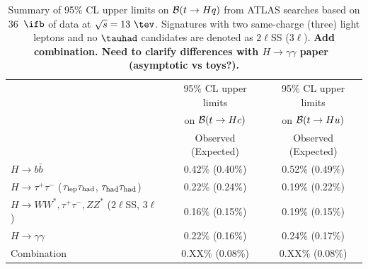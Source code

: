 \begin{table}[t!]
\begin{center}
\begin{tabular}{lcc}
\toprule\toprule
 & \multicolumn{1}{c}{95\% CL upper limits} & \multicolumn{1}{c}{95\% CL upper limits}  \\
 & \multicolumn{1}{c}{on $\mathcal{B}(t \to Hc)$} & \multicolumn{1}{c}{on $\mathcal{B}(t \to Hu)$} \\
 &  Observed (Expected) & Observed (Expected)  \\
\midrule\midrule
$H \to b\bar{b}$ & 0.42\% (0.40\%) & 0.52\% (0.49\%) \\
$H \to \tau^+\tau^-$ ($\tau_{\mathrm{lep}} \tau_{\mathrm{had}}$, $\tau_{\mathrm{had}} \tau_{\mathrm{had}}$) & 0.22\% (0.24\%) & 0.19\% (0.22\%) \\ 
$H \to WW^*, \tau^+\tau^-, ZZ^*$ ($2\ell$SS, $3\ell$)~\cite{Aaboud:2018pob}  & 0.16\% (0.15\%) & 0.19\% (0.15\%) \\ 
$H \to \gamma\gamma$~\cite{Aaboud:2017mfd} & 0.22\% (0.16\%) & 0.24\% (0.17\%) \\
\midrule
Combination  & 0.XX\% (0.08\%) & 0.XX\% (0.08\%) \\
\bottomrule\bottomrule
\end{tabular}
\caption{\small{Summary of 95\% CL upper limits on $\mathcal{B}(t \to Hq)$ from ATLAS searches based on 
36~$\ifb$ of data at $\sqrt{s}=13~\tev$. Signatures with two same-charge (three) light leptons and no $\tauhad$ candidates
are denoted as $2\ell$SS ($3\ell$). \textbf{Add combination. Need to clarify differences with $H \to \gamma\gamma$ paper~\cite{Aaboud:2017mfd} (asymptotic vs toys?).}}}
\label{tab:limits_summary}
\end{center}
\end{table}

